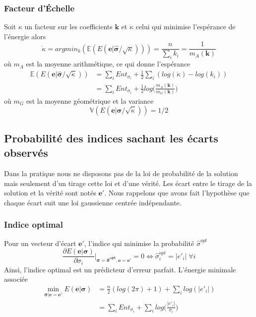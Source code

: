 \documentclass[../main/These_Mathias_Paget.tex]{subfiles}
\begin{document}
\subsubsection{Facteur d’Échelle}
Soit $\kappa$ un facteur sur les coefficients $\boldsymbol{k}$ et $\dot{\kappa}$ celui qui minimise l’espérance de l’énergie alors
\begin{equation}
\dot{\kappa} = argmin_{k}({\mathbb{E}(E(\boldsymbol{e}|\boldsymbol{\hat{\sigma}}/\sqrt{\kappa}))}) = \frac{n}{\sum_{i}k_i} = \frac{1}{m_A(\boldsymbol{k})}
\end{equation}
où $m_A$ est la moyenne arithmétique, ce qui donne l’espérance
\begin{equation}
\begin{aligned}
\mathbb{E}(E(\boldsymbol{e}|\boldsymbol{\hat{\sigma}}/\sqrt{\dot{\kappa}})) &= \sum_iEnt_{\dot{\sigma}_i} + \frac{1}{2}\sum_{i}( log(\dot{\kappa}) - log(k_i)) \\
&= \sum_iEnt_{\dot{\sigma}_i} + \frac{1}{2} log \bigg(\frac{m_A(\boldsymbol{k})}{m_G(\boldsymbol{k})}\bigg)
\end{aligned}
\end{equation}
où $m_G$ est la moyenne géométrique et la variance
\begin{equation}
\mathbb{V}(E(\boldsymbol{e}|\boldsymbol{\sigma}/\sqrt{\dot{\kappa}})) =  1/2
\end{equation}

\subsection{Probabilité des indices sachant les écarts observés}
Dans la pratique nous ne disposons pas de la loi de probabilité de la solution mais seulement d'un tirage cette loi et d'une vérité. Les écart entre le tirage de la solution et la vérité sont notés $\boldsymbol{e'}$. Nous rappelons que  avons fait l'hypothèse que chaque écart suit une loi gaussienne centrée indépendante.

\subsubsection{Indice optimal}
Pour un vecteur d’écart $\boldsymbol{e'}$, l'indice qui minimise la probabilité $\hat{\sigma}^{opt}$
\begin{equation}
\frac{\partial E(\boldsymbol{e}|\boldsymbol{\sigma})}{\partial \sigma_i}\bigg|_{\boldsymbol{\sigma} = \boldsymbol{\hat{\sigma}^{opt}}, \boldsymbol{e} = \boldsymbol{e'}} = 0 \Leftrightarrow  \hat{\sigma}^{opt}_i = |e'_i|  \; \forall i
\end{equation}
Ainsi, l'indice optimal est un prédicteur d'erreur parfait. L’énergie minimale associée
\begin{equation}
\begin{aligned}
 \min_{\boldsymbol{\sigma} | \boldsymbol{e} = \boldsymbol{e'}  }{E(\boldsymbol{e}|\boldsymbol{\sigma})} &= \frac{n}{2}(log(2\pi)+1)  + \sum_i{log(|e'_i|)} \\
 &= \sum_iEnt_{\dot{\sigma}_i} + \sum_i{log \Bigg(\frac{|e'_i|}{\dot{\sigma}_i}\Bigg)}
\end{aligned}
\end{equation}
\end{document}
